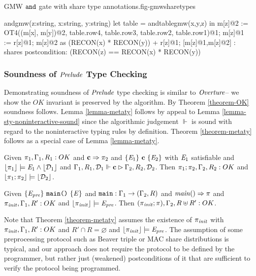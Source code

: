 \begin{fpfig}[t]{GMW $\texttt{and}$ gate with share type annotations.}{fig-gmwsharetypes}
\begin{verbatimtab}
andgmw(z:string, x:string, y:string) {
  let table = andtablegmw(x,y,z) in
  m[z]@2 := OT4((m[x], m[y])@2, table.row4, table.row3, table.row2, table.row1)@1;
  m[z]@1 := r[z]@1;
  m[z]@2 as (RECON(x) * RECON(y)) + r[z]@1;
  [m[z]@1,m[z]@2] : shares
}
postcondition: (RECON(z) == RECON(x) * RECON(y))
\end{verbatimtab}
\end{fpfig}

\subsubsection{Soundness of $\mathit{Prelude}$ Type Checking}

Demonstrating soundness of $\mathit{Prelude}$ type checking is similar to $\mathit{Overture}$--
we show the ${OK}$ invariant is preserved by the algorithm. By Theorem \ref{theorem-OK}
soundness follows. Lemma \ref{lemma-metaty} follows by appeal to Lemma \ref{lemma-sty-noninteractive-sound}
since the algorithmic judgement $\Vdash$ is sound with regard to the noninteractive
typing rules by definition. Theorem \ref{theorem-metaty} follows as a special
case of Lemma \ref{lemma-metaty}.
\begin{lemma}
  \label{lemma-metaty}
  Given $\pi_1,\Gamma_1,R_1 : {OK}$ and $\mathbf{c} \Rightarrow \pi_2$ and $\{ \mathit{E}_1 \}\ \mathbf{c}\ \{ \mathit{E}_2 \}$ with
  $\mathit{E}_1$ satisfiable and $\lfloor \pi_1 \rfloor \models \mathit{E}_1 \wedge \lfloor \mathcal{D}_1 \rfloor$ and
  $\Gamma_1,R_1,\mathcal{D}_1 \Vdash \mathbf{c} \rhd \Gamma_2,R_2,\mathcal{D}_2$.
  Then $\pi_1;\pi_2,\Gamma_2,R_2 : {OK}$ and $\lfloor \pi_1;\pi_2 \rfloor \models \lfloor \mathcal{D}_2 \rfloor$.
\end{lemma}

\begin{theorem}
  \label{theorem-metaty}
  Given $\{ \mathit{E}_{\mathit{pre}} \}\ \texttt{main()}\ \{ \mathit{E} \}$ and $\texttt{main} : \Gamma_1 \rightarrow (\Gamma_2,R)$
  and $\mathit{main}() \Rightarrow \pi$ and $\pi_{\mathit{init}},\Gamma_1,R' : {OK}$ %
  and $\lfloor \pi_{\mathit{init}} \rfloor \models \mathit{E}_{\mathit{pre}}$. Then $(\pi_{\mathit{init}};\pi),\Gamma_2,R \uplus R': {OK}$.
\end{theorem}

Note that Theorem \ref{theorem-metaty} assumes the existence of
$\pi_{\mathit{init}}$ with $\pi_{\mathit{init}},\Gamma_1,R' : {OK}$ and $R' \cap R =
\varnothing$ and $\lfloor \pi_{\mathit{init}} \rfloor \models \mathit{E}_{\mathit{pre}}$. The assumption of
some preprocessing protocol such as Beaver triple or MAC share
distributions is typical, and our approach does not require the
protocol to be defined by the programmer, but rather just (weakened)
postconditions of it that are sufficient to verify the protocol being
programmed.

